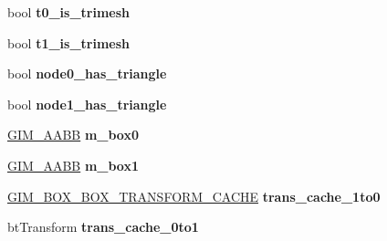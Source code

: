 \begin{DoxyCompactItemize}
\item 
\hypertarget{class_g_i_m___t_r_e_e___t_r_e_e___c_o_l_l_i_d_e_r_af7745f99e57773dc9c977cba11859dfa}{bool {\bfseries t0\+\_\+is\+\_\+trimesh}}\label{class_g_i_m___t_r_e_e___t_r_e_e___c_o_l_l_i_d_e_r_af7745f99e57773dc9c977cba11859dfa}

\item 
\hypertarget{class_g_i_m___t_r_e_e___t_r_e_e___c_o_l_l_i_d_e_r_abefcc8a85a1f197bf818aaf77cb2f4f7}{bool {\bfseries t1\+\_\+is\+\_\+trimesh}}\label{class_g_i_m___t_r_e_e___t_r_e_e___c_o_l_l_i_d_e_r_abefcc8a85a1f197bf818aaf77cb2f4f7}

\item 
\hypertarget{class_g_i_m___t_r_e_e___t_r_e_e___c_o_l_l_i_d_e_r_a464a9c92f0463ae8b805614d18a82d2b}{bool {\bfseries node0\+\_\+has\+\_\+triangle}}\label{class_g_i_m___t_r_e_e___t_r_e_e___c_o_l_l_i_d_e_r_a464a9c92f0463ae8b805614d18a82d2b}

\item 
\hypertarget{class_g_i_m___t_r_e_e___t_r_e_e___c_o_l_l_i_d_e_r_a2f69330c2f46d86ac668507d479eb846}{bool {\bfseries node1\+\_\+has\+\_\+triangle}}\label{class_g_i_m___t_r_e_e___t_r_e_e___c_o_l_l_i_d_e_r_a2f69330c2f46d86ac668507d479eb846}

\item 
\hypertarget{class_g_i_m___t_r_e_e___t_r_e_e___c_o_l_l_i_d_e_r_ade3ced8be9de58b0a375bd8528bd7e05}{\hyperlink{class_g_i_m___a_a_b_b}{G\+I\+M\+\_\+\+A\+A\+B\+B} {\bfseries m\+\_\+box0}}\label{class_g_i_m___t_r_e_e___t_r_e_e___c_o_l_l_i_d_e_r_ade3ced8be9de58b0a375bd8528bd7e05}

\item 
\hypertarget{class_g_i_m___t_r_e_e___t_r_e_e___c_o_l_l_i_d_e_r_a36f9edc153cb2c5755f56fe5339488c4}{\hyperlink{class_g_i_m___a_a_b_b}{G\+I\+M\+\_\+\+A\+A\+B\+B} {\bfseries m\+\_\+box1}}\label{class_g_i_m___t_r_e_e___t_r_e_e___c_o_l_l_i_d_e_r_a36f9edc153cb2c5755f56fe5339488c4}

\item 
\hypertarget{class_g_i_m___t_r_e_e___t_r_e_e___c_o_l_l_i_d_e_r_a719a32cf361143d6409fa51a103906b2}{\hyperlink{class_g_i_m___b_o_x___b_o_x___t_r_a_n_s_f_o_r_m___c_a_c_h_e}{G\+I\+M\+\_\+\+B\+O\+X\+\_\+\+B\+O\+X\+\_\+\+T\+R\+A\+N\+S\+F\+O\+R\+M\+\_\+\+C\+A\+C\+H\+E} {\bfseries trans\+\_\+cache\+\_\+1to0}}\label{class_g_i_m___t_r_e_e___t_r_e_e___c_o_l_l_i_d_e_r_a719a32cf361143d6409fa51a103906b2}

\item 
\hypertarget{class_g_i_m___t_r_e_e___t_r_e_e___c_o_l_l_i_d_e_r_ad4828575c803930fcb7e45f0a93544ed}{bt\+Transform {\bfseries trans\+\_\+cache\+\_\+0to1}}\label{class_g_i_m___t_r_e_e___t_r_e_e___c_o_l_l_i_d_e_r_ad4828575c803930fcb7e45f0a93544ed}


\end{DoxyCompactItemize}
